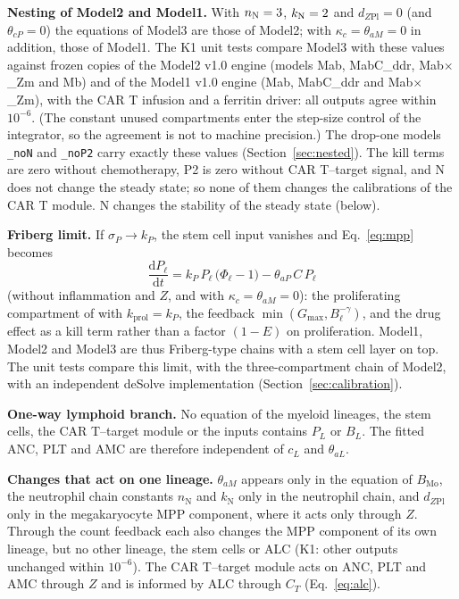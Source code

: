 \documentclass[11pt]{article}
\newcommand{\dd}{\mathrm{d}}
\begin{document}
\textbf{Nesting of Model2 and Model1.} With $n_{\mathrm{N}}=3$, $k_{\mathrm{N}}=2$ and $d_{Z\mathrm{Pl}}=0$ (and $\theta_{cP}=0$) the equations of Model3 are those of Model2; with $\kappa_c=\theta_{aM}=0$ in addition, those of Model1. The K1 unit tests compare Model3 with these values against frozen copies of the Model2 v1.0 engine (models Mab, MabC\_ddr, Mab$\times$\_Zm and Mb) and of the Model1 v1.0 engine (Mab, MabC\_ddr and Mab$\times$\_Zm), with the CAR T infusion and a ferritin driver: all outputs agree within $10^{-6}$. (The constant unused compartments enter the step-size control of the integrator, so the agreement is not to machine precision.) The drop-one models \texttt{\_noN} and \texttt{\_noP2} carry exactly these values (Section~\ref{sec:nested}). The kill terms are zero without chemotherapy, P2 is zero without CAR T--target signal, and N does not change the steady state; so none of them changes the calibrations of the CAR T module. N changes the stability of the steady state (below).

\textbf{Friberg limit.} If $\sigma_P\to k_P$, the stem cell input vanishes and Eq.~\ref{eq:mpp} becomes
\begin{equation*}
\frac{\dd P_\ell}{\dd t} = k_P\,P_\ell\,\bigl(\Phi_\ell-1\bigr) - \theta_{aP}\,C\,P_\ell
\end{equation*}
(without inflammation and $Z$, and with $\kappa_c=\theta_{aM}=0$): the proliferating compartment of \citet{friberg2002} with $k_{\mathrm{prol}}=k_P$, the feedback $\min(G_{\max},B_\ell^{-\gamma})$, and the drug effect as a kill term rather than a factor $(1-E)$ on proliferation. Model1, Model2 and Model3 are thus Friberg-type chains with a stem cell layer on top. The unit tests compare this limit, with the three-compartment chain of Model2, with an independent deSolve implementation (Section~\ref{sec:calibration}).

\textbf{One-way lymphoid branch.} No equation of the myeloid lineages, the stem cells, the CAR T--target module or the inputs contains $P_L$ or $B_L$. The fitted ANC, PLT and AMC are therefore independent of $c_L$ and $\theta_{aL}$.

\textbf{Changes that act on one lineage.} $\theta_{aM}$ appears only in the equation of $B_{\mathrm{Mo}}$, the neutrophil chain constants $n_{\mathrm{N}}$ and $k_{\mathrm{N}}$ only in the neutrophil chain, and $d_{Z\mathrm{Pl}}$ only in the megakaryocyte MPP component, where it acts only through $Z$. Through the count feedback each also changes the MPP component of its own lineage, but no other lineage, the stem cells or ALC (K1: other outputs unchanged within $10^{-6}$). The CAR T--target module acts on ANC, PLT and AMC through $Z$ and is informed by ALC through $C_T$ (Eq.~\ref{eq:alc}).
\end{document}
